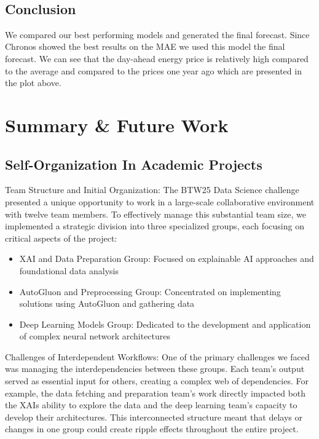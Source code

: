 \documentclass[a4paper]{article}
\providecommand{\tightlist}{%
      \setlength{\itemsep}{0pt}\setlength{\parskip}{0pt}}
\begin{document}
    \begin{center}
    \end{center}
    { \hspace*{\fill} \\}
    
    \subsection{Conclusion}\label{conclusion}

We compared our best performing models and generated the final forecast.
Since Chronos showed the best results on the MAE we used this model the
final forecast. We can see that the day-ahead energy price is relatively
high compared to the average and compared to the prices one year ago
which are presented in the plot above.

    \section{Summary \& Future Work}\label{summary-future-work}

    \subsection{Self-Organization In Academic
Projects}\label{self-organization-in-academic-projects}

Team Structure and Initial Organization: The BTW25 Data Science
challenge presented a unique opportunity to work in a large-scale
collaborative environment with twelve team members. To effectively
manage this substantial team size, we implemented a strategic division
into three specialized groups, each focusing on critical aspects of the
project:

\begin{itemize}
\tightlist
\item
  XAI and Data Preparation Group: Focused on explainable AI approaches
  and foundational data analysis
\item
  AutoGluon and Preprocessing Group: Concentrated on implementing
  solutions using AutoGluon and gathering data
\item
  Deep Learning Models Group: Dedicated to the development and
  application of complex neural network architectures
\end{itemize}

Challenges of Interdependent Workflows: One of the primary challenges we
faced was managing the interdependencies between these groups. Each
team's output served as essential input for others, creating a complex
web of dependencies. For example, the data fetching and preparation
team's work directly impacted both the XAIs ability to explore the data
and the deep learning team's capacity to develop their architectures.
This interconnected structure meant that delays or changes in one group
could create ripple effects throughout the entire project.
\end{document}
